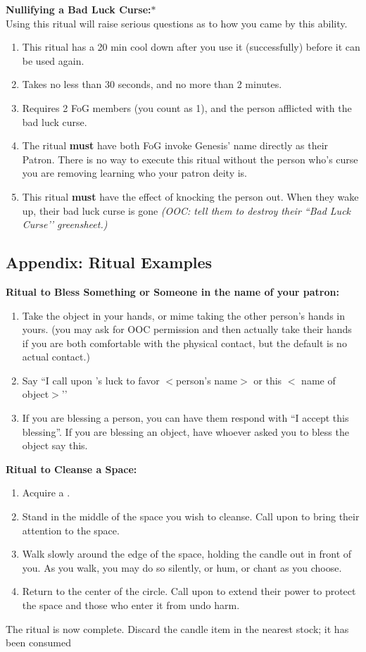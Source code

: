 \documentclass[green]{GL2020}
\begin{document}
\textbf{Nullifying a Bad Luck Curse:}$*$\\
Using this ritual will raise serious questions as to how you came by this ability.

\begin{enumerate}
    \item This ritual has a 20 min cool down after you use it (successfully) before it can be used again.
    \item Takes no less than 30 seconds, and no more than 2 minutes.
    \item Requires 2 FoG members (you count as 1), and the person afflicted with the bad luck curse.
    \item The ritual \textbf{must} have both FoG invoke Genesis’ name directly as their Patron. There is no way to execute this ritual without the person who’s curse you are removing learning who your patron deity is.
		\item This ritual \textbf{must} have the effect of knocking the person out. When they wake up, their bad luck curse is gone \emph{(OOC: tell them to destroy their ``Bad Luck Curse’’ greensheet.)}
  \end{enumerate}

\subsection*{Appendix: Ritual Examples}

\textbf{Ritual to Bless Something or Someone in the name of your patron:}
  \begin{enumerate}
    \item Take the object in your hands, or mime taking the other person’s hands in yours. (you may ask for OOC permission and then actually take their hands if you are both comfortable with the physical contact, but the default is no actual contact.)
    \item Say ``I call upon \cGenesis{}’s luck to favor $<$person’s name$>$ or this $<$ name of object$>$’’
    \item If you are blessing a person, you can have them respond with ``I accept this blessing''. If you are blessing an object, have whoever asked you to bless the object say this.
  \end{enumerate}

\textbf{Ritual to Cleanse a Space:}
  \begin{enumerate}
    \item Acquire a \iRitualCandle{}.
    \item Stand in the middle of the space you wish to cleanse. Call upon \cGenesis{} to bring their attention to the space.
    \item Walk slowly around the edge of the space, holding the candle out in front of you. As you walk, you may do so silently, or hum, or chant as you choose.
    \item Return to the center of the circle. Call upon \cGenesis{} to extend their power to protect the space and those who enter it from undo harm.
  \end{enumerate}
The ritual is now complete. Discard the candle item in the nearest stock; it has been consumed
   
\end{document}
